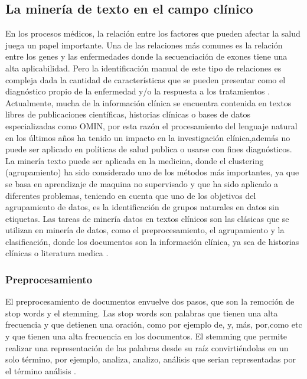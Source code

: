 {\subsection{La minería de texto en el campo clínico}

En los procesos médicos, la relación entre los factores que pueden afectar la salud juega un papel importante. Una de las relaciones más comunes es la relación entre los genes y las enfermedades donde la secuenciación de exones tiene una alta aplicabilidad. Pero la identificación manual de este tipo de relaciones es compleja dada la cantidad de características que se pueden presentar como el diagnóstico propio de la enfermedad y/o la respuesta a los tratamientos \cite{Kawashima2017}.\\

Actualmente, mucha de la información clínica se encuentra contenida en textos libres de publicaciones científicas, historias clínicas o bases de datos especializadas como OMIN, por esta razón el procesamiento del lenguaje natural en los últimos años ha tenido un impacto en la investigación clínica,además no puede ser aplicado en políticas de salud publica o usarse con fines diagnósticos. \cite{Neveol2014}\\

La minería texto  puede ser aplicada en la medicina, donde el clustering (agrupamiento) ha sido considerado uno de los métodos más importantes, ya que se basa en aprendizaje de maquina no supervisado y que ha sido aplicado a diferentes problemas\cite{Kawashima2017}, teniendo en cuenta que uno de los objetivos del agrupamiento de datos, es la  identificación de grupos naturales en datos sin etiquetas. Las tareas de minería datos en textos clínicos son las clásicas que se utilizan en minería de datos, como el preprocesamiento, el agrupamiento y la clasificación, donde los documentos son la información clínica, ya sea de historias clínicas o literatura medica \cite{Jain2010,Renganathan2017}.

\subsubsection{Preprocesamiento}

El preprocesamiento de documentos envuelve dos pasos, que son la remoción de stop words y el stemming. Las stop words son palabras que tienen una alta frecuencia y  que detienen una oración, como por ejemplo de, y, más, por,como etc y que tienen una alta frecuencia en los documentos. El stemming  que permite realizar una representación de las palabras desde su raíz convirtiéndolas en un solo término, por ejemplo, analiza, analizo, análisis que serian representadas por el término análisis \cite{Renganathan2017}.\\

}
